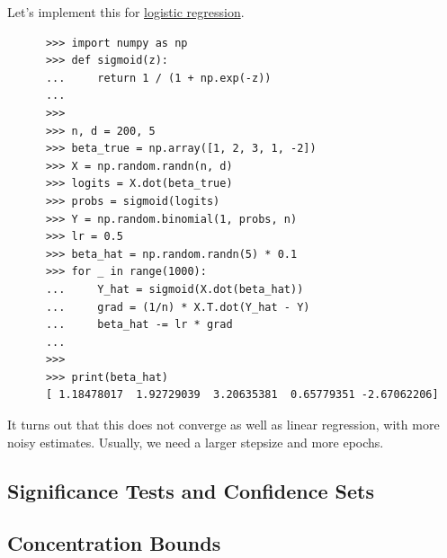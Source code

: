   \begin{example}
    \label{ex:sgd-from-scratch}
    Let's implement this for \hyperref[def:logistic-regression]{logistic regression}. 

    \begin{lstlisting}
      >>> import numpy as np 
      >>> def sigmoid(z):
      ...     return 1 / (1 + np.exp(-z))
      ... 
      >>> 
      >>> n, d = 200, 5
      >>> beta_true = np.array([1, 2, 3, 1, -2])
      >>> X = np.random.randn(n, d)
      >>> logits = X.dot(beta_true)
      >>> probs = sigmoid(logits)
      >>> Y = np.random.binomial(1, probs, n)
      >>> lr = 0.5
      >>> beta_hat = np.random.randn(5) * 0.1
      >>> for _ in range(1000): 
      ...     Y_hat = sigmoid(X.dot(beta_hat))
      ...     grad = (1/n) * X.T.dot(Y_hat - Y)
      ...     beta_hat -= lr * grad  
      ... 
      >>> 
      >>> print(beta_hat)
      [ 1.18478017  1.92729039  3.20635381  0.65779351 -2.67062206]
    \end{lstlisting}
   
    It turns out that this does not converge as well as linear regression, with more noisy estimates. Usually, we need a larger stepsize and more epochs. 
  \end{example}

\subsection{Significance Tests and Confidence Sets}

\subsection{Concentration Bounds}

